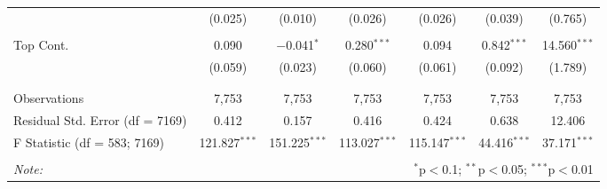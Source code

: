 \begin{table}[!htbp]
\begin{tabular}{@{\extracolsep{5pt}}lcccccc}
  & (0.025) & (0.010) & (0.026) & (0.026) & (0.039) & (0.765) \\ 
  & & & & & & \\ 
 Top Cont. & 0.090 & $-$0.041$^{*}$ & 0.280$^{***}$ & 0.094 & 0.842$^{***}$ & 14.560$^{***}$ \\ 
  & (0.059) & (0.023) & (0.060) & (0.061) & (0.092) & (1.789) \\ 
  & & & & & & \\ 
\hline \\[-1.8ex] 
Observations & 7,753 & 7,753 & 7,753 & 7,753 & 7,753 & 7,753 \\ 
Residual Std. Error (df = 7169) & 0.412 & 0.157 & 0.416 & 0.424 & 0.638 & 12.406 \\ 
F Statistic (df = 583; 7169) & 121.827$^{***}$ & 151.225$^{***}$ & 113.027$^{***}$ & 115.147$^{***}$ & 44.416$^{***}$ & 37.171$^{***}$ \\ 
\hline 
\hline \\[-1.8ex] 
\textit{Note:}  & \multicolumn{6}{r}{$^{*}$p$<$0.1; $^{**}$p$<$0.05; $^{***}$p$<$0.01} \\ 
\end{tabular} 
\end{table} 
